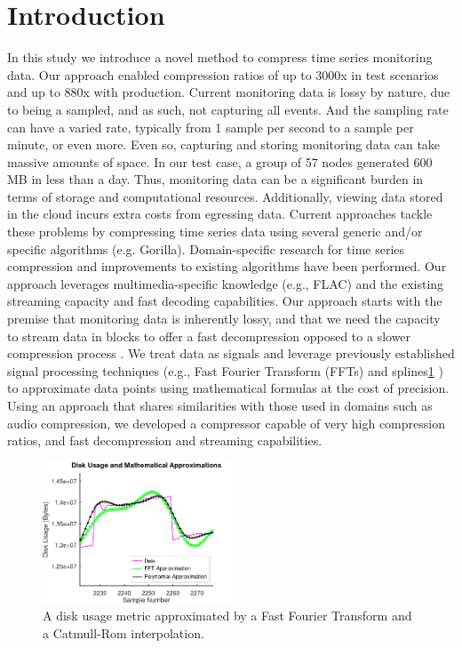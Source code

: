 \documentclass[conference]{IEEEtran}
\begin{document}
\section{Introduction}
In this study we introduce a novel method to compress time series monitoring data. 
Our approach enabled compression ratios of up to 3000x in test scenarios and up to 880x with production.
Current monitoring data is lossy by nature, due to being a sampled, and as such, not capturing all events. And the sampling rate can have a varied rate, typically from 1 sample per second to a sample per minute\cite{monitoring-samples}, or even more\cite{microsoft}.  
Even so, capturing and storing monitoring data can take massive amounts of space. In our test case, a group of 57 nodes generated 600 MB in less than a day.
Thus, monitoring data can be a significant burden in terms of storage and computational resources. Additionally, viewing data stored in the cloud incurs extra costs from egressing data.
Current approaches tackle these problems by compressing time series data using several generic and/or specific algorithms\cite{compression} (e.g. Gorilla\cite{gorilla}).
Domain-specific research for time series compression\cite{nasa-compression}\cite{smartgrid} and improvements to existing algorithms\cite{victoria} have been performed.
Our approach leverages multimedia-specific knowledge (e.g., FLAC\cite{flac}) and the existing streaming capacity and fast decoding capabilities.
Our approach starts with the premise that monitoring data is inherently lossy, and that we need the capacity to stream data in blocks to offer a fast decompression opposed to a slower compression process   .
We treat data as signals and leverage previously established signal processing techniques (e.g., Fast Fourier Transform (FFTs) and splines\ref{math_aprox}
) to approximate data points using mathematical formulas at the cost of precision.
Using an approach that shares similarities with those used in domains such as audio compression, we developed a compressor capable of very high compression ratios, and fast decompression and streaming capabilities.

\begin{figure}[ht]
  \centering
  \includegraphics[width=0.5\textwidth]{math_approximation-4.png}
  \caption{A disk usage metric approximated by a Fast Fourier Transform and a Catmull-Rom interpolation.}
  \label{math_aprox}
\end{figure}
\end{document}
